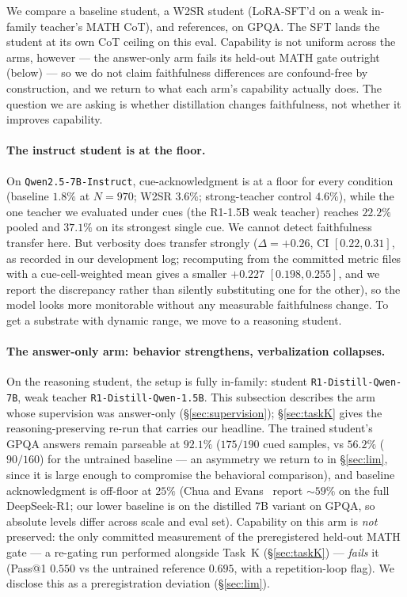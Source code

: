 \documentclass{article}
\begin{document}
We compare a baseline student, a W2SR student (LoRA-SFT'd on a weak in-family
teacher's MATH CoT), and references, on GPQA. The SFT lands the student at its
own CoT ceiling on this eval. Capability is not uniform across the arms,
however --- the answer-only arm fails its held-out MATH gate outright (below)
--- so we do not claim faithfulness differences are confound-free by
construction, and we return to what each arm's capability actually does. The
question we are asking is whether distillation changes faithfulness, not
whether it improves capability.

\paragraph{The instruct student is at the floor.}
On \texttt{Qwen2.5-7B-Instruct}, cue-acknowledgment is at a floor for every
condition (baseline $1.8\%$ at $N\!=\!970$; W2SR $3.6\%$; strong-teacher
control $4.6\%$), while the one teacher we evaluated under cues (the R1-1.5B weak teacher)
reaches $22.2\%$ pooled and $37.1\%$ on its strongest single cue. We cannot
detect faithfulness transfer here. But verbosity does transfer strongly
($\Delta = +0.26$, CI $[0.22, 0.31]$, as recorded in our development log;
recomputing from the committed metric files with a cue-cell-weighted mean gives
a smaller $+0.227$ $[0.198, 0.255]$, and we report the discrepancy rather than
silently substituting one for the other), so the model
looks more monitorable without any measurable faithfulness change. To get a
substrate with dynamic range, we move to a reasoning student.

\paragraph{The answer-only arm: behavior strengthens, verbalization collapses.}
On the reasoning student, the setup is fully in-family: student
\texttt{R1-Distill-Qwen-7B}, weak teacher \texttt{R1-Distill-Qwen-1.5B}. This
subsection describes the arm whose supervision was answer-only
(\S\ref{sec:supervision}); \S\ref{sec:taskK} gives the reasoning-preserving
re-run that carries our headline. The trained student's GPQA answers remain
parseable at $92.1\%$ ($175/190$ cued samples, vs $56.2\%$ ($90/160$) for the
untrained baseline --- an asymmetry we return to in \S\ref{sec:lim}, since it
is large enough to compromise the behavioral comparison), and baseline acknowledgment is off-floor at $25\%$ (Chua and
Evans~\cite{chua2025} report ${\sim}59\%$ on the full DeepSeek-R1; our lower
baseline is on the distilled 7B variant on GPQA, so absolute levels differ
across scale and eval set). Capability on this arm is \emph{not} preserved:
the only committed measurement of the preregistered held-out MATH gate ---
a re-gating run performed alongside Task~K (\S\ref{sec:taskK}) --- \emph{fails}
it (Pass@1 $0.550$ vs the untrained reference $0.695$, with a repetition-loop
flag). We disclose this as a preregistration deviation (\S\ref{sec:lim}).
\end{document}
